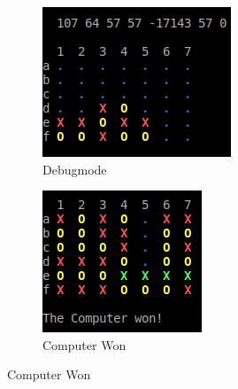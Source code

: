 \documentclass[10pt,a4paper,titlepage]{article}
\begin{document}
\begin{figure}
	\centering
	\begin{subfigure}{.5\textwidth}
		\centering
		\includegraphics[width=0.9\linewidth]{img/debugmode.png}
		\caption{Debugmode}
		\label{fig:sub3}
	\end{subfigure}%
	\begin{subfigure}{.5\textwidth}
		\centering
		\includegraphics[width=0.9\linewidth]{img/computerwon.png}
		\caption{Computer Won}
		\label{fig:sub4}
	\end{subfigure}
	\label{fig:test}
\end{figure}
\end{document}
